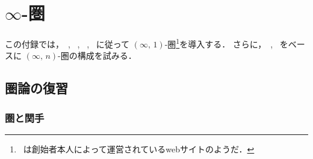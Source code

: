 \documentclass[TQFT_main]{subfiles}
\begin{document}
\chapter{$\infty$-圏}

この付録では，~\cite{lurie2008higher}, ~\cite{Kerodon}, ~\cite{Land2021infinity}, ~\cite{alfonsi2023higher}に従って $(\infty,\, 1)$-圏\footnote{~\cite{Kerodon}は創始者本人によって運営されているwebサイトのようだ．}を導入する．
さらに，~\cite{barwick2020unicityhomotopytheoryhigher}, ~\cite{ayala2020factorizationhomologyihigher}をベースに $(\infty,\, n)$-圏の構成を試みる．

\section{圏論の復習}

\subsection{圏と関手}
\end{document}
